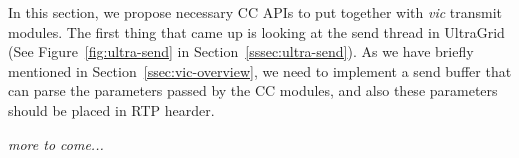 
In this section, we propose necessary CC APIs to put together with \emph{vic}
transmit modules. The first thing that came up is looking at the send thread in
UltraGrid (See Figure~\ref{fig:ultra-send} in Section~\ref{sssec:ultra-send}).
As we have briefly mentioned in Section~\ref{ssec:vic-overview}, we need to
implement a send buffer that can parse the parameters passed by the CC modules,
and also these parameters should be placed in RTP hearder.

\vspace{5cm}

\begin{center}

\textit{\textsf{more to come...}}

\end{center}


\newpage
